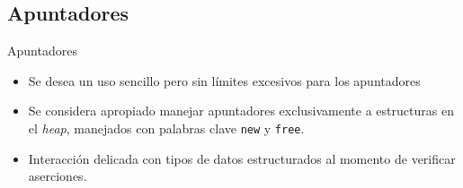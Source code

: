 \subsection{Apuntadores}
\begin{frame}{Apuntadores}
\begin{itemize}
  \item Se desea un uso sencillo pero sin límites excesivos para los apuntadores
  \item Se considera apropiado manejar apuntadores exclusivamente a estructuras en el \textit{heap},
    manejados con palabras clave \texttt{new} y \texttt{free}.
  \item Interacción delicada con tipos de datos estructurados al momento de verificar aserciones.
\end{itemize}
\end{frame}